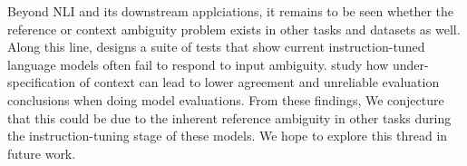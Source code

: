 Beyond NLI and its downstream applciations, it remains to be seen whether the reference or context ambiguity problem exists in other tasks and datasets as well.  Along this line,  \citet{liu-etal-2023-afraid} designs a suite of tests that show current instruction-tuned language models often fail to respond to input ambiguity. \citet{malaviya2024contextualized} study how under-specification of context can lead to lower agreement and unreliable evaluation conclusions when doing model evaluations.  
From these findings, We conjecture that this could be due to the inherent reference ambiguity in other tasks during the instruction-tuning stage of these models. We hope to explore this thread in future work. 

